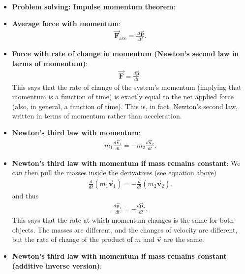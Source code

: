 \documentclass{report}
\begin{document}
\begin{itemize}
\begin{itemize}
            \end{itemize}
        \item \textbf{Problem solving: Impulse momentum theorem}:
        \item \textbf{Average force with momentum}:
            \begin{align*}
                \vec{\mathbf{F}}_{\text{ave}} = \frac{\Delta \vec{\mathbf{p}}}{\Delta t}
            .\end{align*}
        \item \textbf{Force with rate of change in momentum (Newton's second law in terms of momentum)}:
            \begin{align*}
                \vec{\mathbf{F}} = \frac{d\vec{\mathbf{p}}}{dt}
            .\end{align*}
            \bigbreak \noindent 
            This says that the rate of change of the system’s momentum (implying that momentum is a function of time) is exactly equal to the net applied force (also, in general, a function of time). This is, in fact, Newton’s second law, written in terms of momentum rather than acceleration.
        \item \textbf{Newton's third law with momentum}:
            \begin{align*}
                m_{1} \frac{d\vec{\mathbf{v}}_{1}}{dt} = -m_{2} \frac{d\vec{\mathbf{v}}_{2}}{dt}
            .\end{align*}
        \item \textbf{Newton's third law with momentum if mass remains constant}: We can then pull the masses inside the derivatives (see equation above)
            \begin{align*}
               \frac{d}{dt}(m_{1}\vec{\mathbf{v}}_{1}) = -\frac{d}{dt}(m_{2}\vec{\mathbf{v}}_{2}) 
            .\end{align*}
            and thus
            \begin{align*}
                \frac{d\vec{\mathbf{p}}_{1}}{dt} = - \frac{d\vec{\mathbf{p}}_{2}}{dt}
            .\end{align*}
            \bigbreak \noindent 
            This says that the rate at which momentum changes is the same for both objects. The masses are different, and the changes of velocity are different, but the rate of change of the product of $m$ and  $\vec{\mathbf{v}}$ are the same.
        \item \textbf{Newton's third law with momentum if mass remains constant (additive inverse version)}:
            \begin{align*}

\end{align*}
\end{itemize}
\end{document}
